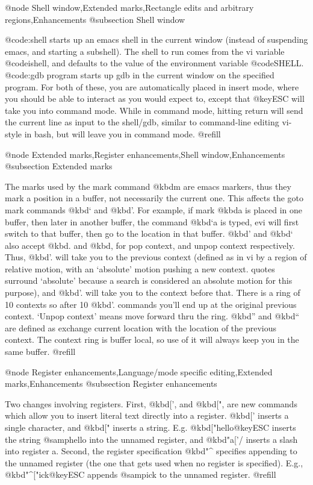 {@node Shell window,Extended marks,Rectangle edits and arbitrary regions,Enhancements
@subsection Shell window

@code{:shell} starts up an emacs shell in the current window (instead of
suspending emacs, and starting a subshell).  The shell to run comes from
the vi variable @code{ishell}, and defaults to the value of the environment
variable @code{SHELL}.
@code{:gdb program} starts up gdb in the current window on
the specified program.  For both of these, you are automatically placed
in insert mode, where you should be able to interact as you would expect
to, except that @key{ESC} will take you into command mode.  While in command
mode, hitting return will send the current line as input to the
shell/gdb, similar to command-line editing vi-style in bash, but will
leave you in command mode. @refill

@node Extended marks,Register enhancements,Shell window,Enhancements
@subsection Extended marks

The marks used by the mark command @kbd{m} are emacs markers, thus they mark
a position in a buffer, not necessarily the current one.  This affects
the goto mark commands @kbd{`} and @kbd{'}.
For example, if mark @kbd{a} is placed
in one buffer, then later in another buffer, the command @kbd{`a} is typed,
evi will first switch to that buffer, then go to the location in that
buffer.  @kbd{'} and @kbd{`} also accept @kbd{.} and @kbd{,} for pop context,
and unpop context respectively.
Thus, @kbd{'.} will take you to the previous context
(defined as in vi by a region of relative motion, with an `absolute'
motion pushing a new context.  quotes surround `absolute' because a
search is considered an absolute motion for this purpose), and @kbd{'.}
will take you to the context before that.  There is a ring of 10
contexts so after 10 @kbd{'.} commands you'll end up at the original
previous context.  `Unpop context' means move forward thru the ring.
@kbd{''} and @kbd{``} are defined as exchange current
location with the location
of the previous context.  The context ring is buffer local, so use of it
will always keep you in the same buffer. @refill

@node Register enhancements,Language/mode specific editing,Extended marks,Enhancements
@subsection Register enhancements

Two changes involving registers.  First, @kbd{['}, and @kbd{["}, are new
commands which allow you to insert literal text directly into a
register.  @kbd{['} inserts a single character, and @kbd{["} inserts a string.
E.g.  @kbd{["hello@key{ESC}} inserts the string @samp{hello} into the unnamed
register, and @kbd{"a['/} inserts a slash into register a.  Second, the
register specification @kbd{"^} specifies appending to the unnamed register
(the one that gets used when no register is specified).  E.g.,
@kbd{"^["ick@key{ESC}} appends @samp{ick} to the unnamed register. @refill

}
